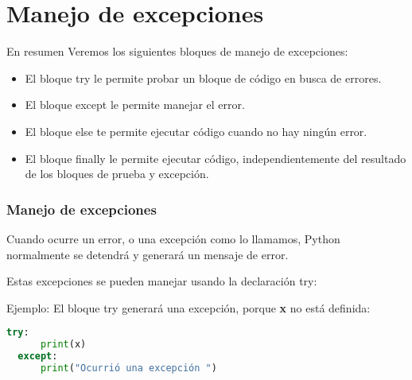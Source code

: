
\section{Manejo de excepciones}

\begin{frame}[c]{En resumen}
  Veremos los siguientes bloques de manejo de excepciones:

  \vspace{\baselineskip}
  \begin{itemize}
    \item El bloque \textcolor{codeKeyword2}{try} le permite probar un
      bloque de código en busca de errores.
    \pausa
    \item El bloque \textcolor{codeKeyword2}{except} le permite manejar el
      error.
    \pausa
    \item El bloque \textcolor{codeKeyword2}{else} te permite ejecutar
      código cuando no hay ningún error.
    \pausa
    \item El bloque \textcolor{codeKeyword2}{finally} le permite ejecutar
      código, independientemente del resultado de los bloques de prueba y
      excepción.
  \end{itemize}
\end{frame}

\begin{frame}[fragile]
  \frametitle{Manejo de excepciones}
  Cuando ocurre un error, o una excepción como lo llamamos, Python
  normalmente se detendrá y generará un mensaje de error.

  \vspace{\baselineskip}
  Estas excepciones se pueden manejar usando la declaración
  \textcolor{codeKeyword2}{try}:

  \vspace{\baselineskip}
  Ejemplo: El bloque \textcolor{codeKeyword2}{try} generará una excepción,
  porque \textbf{x} no está definida:
  \begin{lstlisting}[language=Python]
  try:
      print(x)
  except:
      print("Ocurrió una excepción ")
  \end{lstlisting}
\end{frame}

